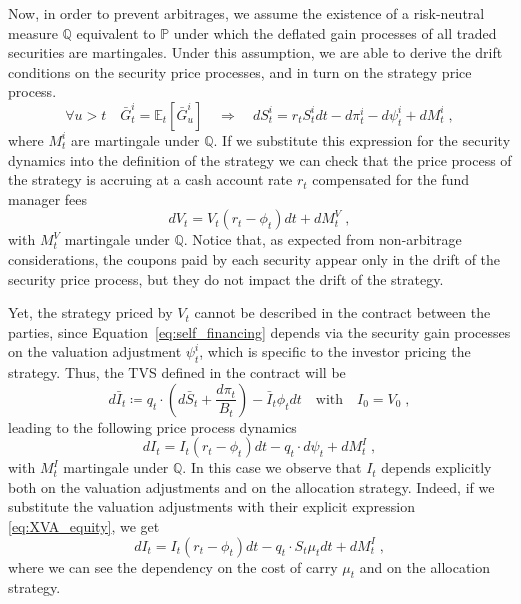 \documentclass[11pt]{article}
\begin{document}
Now, in order to prevent arbitrages, we assume the existence of a risk-neutral measure $\mathbb{Q}$ equivalent to $\mathbb{P}$ under which the deflated gain processes of all traded securities are martingales. Under this assumption, we are able to derive the drift conditions on the security price processes, and in turn on the strategy price process.
\begin{equation}
    \forall u >t \quad \bar{G}_t^i = \mathbb{E}_t \left[\bar{G}_u^i\right] \quad\Longrightarrow \quad dS_t^i = r_tS_t^idt-d\pi_t^i-d\psi_t^i + dM_t^i \; ,
\label{eq:risk_neutral}\end{equation}
where $M_t^i$ are martingale under $\mathbb{Q}$. If we substitute this expression for the security dynamics into the definition of the strategy we can check that the price process of the strategy is accruing at a cash account rate $r_t$ compensated for the fund manager fees
\begin{equation}
    dV_t = V_t(r_t-\phi_t)dt + dM_t^V \; ,
\end{equation}
with $M_t^V$ martingale under $\mathbb{Q}$. Notice that, as expected from non-arbitrage considerations, the coupons paid by each security appear only in the drift of the security price process, but they do not impact the drift of the strategy. 

Yet, the strategy priced by $V_t$ cannot be described in the contract between the parties, since Equation~\eqref{eq:self_financing} depends via the security gain processes on the valuation adjustment $\psi_t^i$, which is specific to the investor pricing the strategy. Thus, the TVS defined in the contract will be
\begin{equation}
    d\bar{I}_t \coloneqq q_t \cdot \left(d\bar{S}_t + \frac{d\pi_t}{B_t} \right) - \bar{I}_t\phi_t dt \quad \text{with} \quad I_0 = V_0 \; , 
\label{eq:TVS_first}\end{equation}
leading to the following price process dynamics
\begin{equation}
    dI_t = I_t(r_t-\phi_t)dt -q_t\cdot d\psi_t +dM_t^I \; ,
\end{equation}
with $M_t^I$ martingale under $\mathbb{Q}$. In this case we observe that $I_t$ depends explicitly both on the valuation adjustments and on the allocation strategy. Indeed, if we substitute the valuation adjustments with their explicit expression \eqref{eq:XVA_equity}, we get
\begin{equation}
    dI_t = I_t(r_t-\phi_t)dt - q_t \cdot S_t \mu_t dt + dM_t^I \; ,
\end{equation}
where we can see the dependency on the cost of carry $\mu_t$ and on the allocation strategy.
\end{document}
